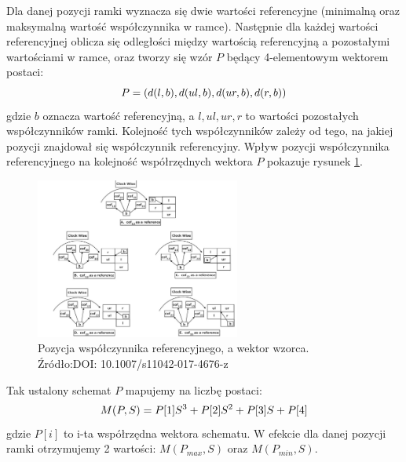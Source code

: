 Dla danej pozycji ramki wyznacza się dwie wartości referencyjne (minimalną oraz maksymalną wartość współczynnika w ramce). Następnie dla każdej wartości referencyjnej oblicza się odległości między wartością referencyjną a pozostałymi wartościami w ramce, oraz tworzy się wzór $P$ będący 4-elementowym wektorem postaci:
\begin{equation}
    P = (d(l, b),\space d(ul,b), \space d(ur, b), \space d(r, b))
\end{equation}
gdzie $b$ oznacza wartość referencyjną, a $l, ul, ur, r$ to wartości pozostałych współczynników ramki. Kolejność tych współczynników zależy od tego, na jakiej pozycji znajdował się współczynnik referencyjny. Wpływ pozycji współczynnika referencyjnego na kolejność współrzędnych wektora $P$ pokazuje rysunek \ref{fig:coeff_order}.
\begin{figure}[ht!]
	\centering
	\includegraphics[width=0.6\textwidth]{./img/dct_match_coeff_order.png}
	\caption{\label{fig:coeff_order} Pozycja współczynnika referencyjnego, a wektor wzorca. Źródło:DOI: 10.1007/s11042-017-4676-z}
\end{figure}

Tak ustalony schemat $P$ mapujemy na liczbę postaci:
\begin{equation}
    M(P,S) = P[1]S^3\space + \space P[2]S^2\space + \space P[3]S\space + \space P[4] 
\end{equation}
gdzie $P[i]$ to i-ta współrzędna wektora schematu. W efekcie dla danej pozycji ramki otrzymujemy 2 wartości: $M(P_{max}, S)$ oraz $M(P_{min}, S)$.\\ 

